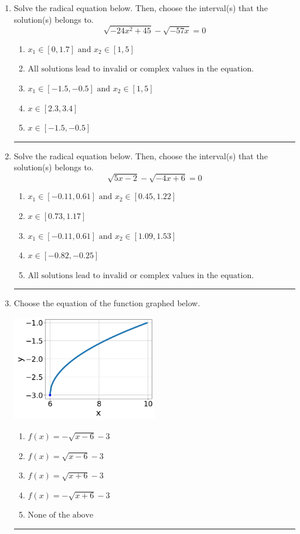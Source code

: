 \documentclass[14pt]{extbook}
\newcommand{\litem}[1]{\item#1\hspace*{-1cm}\rule{\textwidth}{0.4pt}}
\begin{document}
\begin{enumerate}
{\begin{enumerate}[label=\Alph*.]
\end{enumerate} }
\litem{
Solve the radical equation below. Then, choose the interval(s) that the solution(s) belongs to.\[ \sqrt{-24 x^2 + 45} - \sqrt{-57 x} = 0 \]\begin{enumerate}[label=\Alph*.]
\item \( x_1 \in [0, 1.7] \text{ and } x_2 \in [1,5] \)
\item \( \text{All solutions lead to invalid or complex values in the equation.} \)
\item \( x_1 \in [-1.5, -0.5] \text{ and } x_2 \in [1,5] \)
\item \( x \in [2.3,3.4] \)
\item \( x \in [-1.5,-0.5] \)

\end{enumerate} }
\litem{
Solve the radical equation below. Then, choose the interval(s) that the solution(s) belongs to.\[ \sqrt{5 x - 2} - \sqrt{-4 x + 6} = 0 \]\begin{enumerate}[label=\Alph*.]
\item \( x_1 \in [-0.11, 0.61] \text{ and } x_2 \in [0.45,1.22] \)
\item \( x \in [0.73,1.17] \)
\item \( x_1 \in [-0.11, 0.61] \text{ and } x_2 \in [1.09,1.53] \)
\item \( x \in [-0.82,-0.25] \)
\item \( \text{All solutions lead to invalid or complex values in the equation.} \)

\end{enumerate} }
\litem{
Choose the equation of the function graphed below.
\begin{center}
    \includegraphics[width=0.5\textwidth]{../Figures/radicalGraphToEquationA.png}
\end{center}
\begin{enumerate}[label=\Alph*.]
\item \( f(x) = - \sqrt{x - 6} - 3 \)
\item \( f(x) = \sqrt{x - 6} - 3 \)
\item \( f(x) = \sqrt{x + 6} - 3 \)
\item \( f(x) = - \sqrt{x + 6} - 3 \)
\item \( \text{None of the above} \)

\end{enumerate} }
\end{enumerate}
\end{document}
